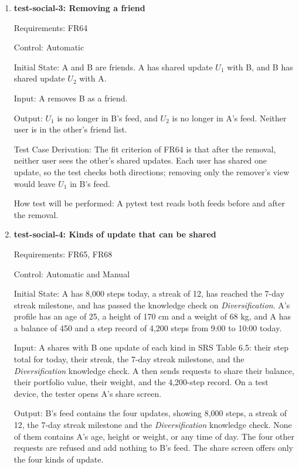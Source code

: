 \documentclass[12pt, titlepage]{article}
\begin{document}
\begin{enumerate}
How test will be performed: A pytest test sends each action as the user named
in the input and reads the friend lists, received requests and feeds after
each step.

\item{\textbf{test-social-3: Removing a friend}\\}

Requirements: FR64

Control: Automatic

Initial State: A and B are friends. A has shared update $U_1$ with B, and B
has shared update $U_2$ with A.

Input: A removes B as a friend.

Output: $U_1$ is no longer in B's feed, and $U_2$ is no longer in A's feed.
Neither user is in the other's friend list.

Test Case Derivation: The fit criterion of FR64 is that after the removal,
neither user sees the other's shared updates. Each user has shared one
update, so the test checks both directions; removing only the remover's view
would leave $U_1$ in B's feed.

How test will be performed: A pytest test reads both feeds before and after
the removal.

\item{\textbf{test-social-4: Kinds of update that can be shared}\\}

Requirements: FR65, FR68

Control: Automatic and Manual

Initial State: A has 8,000 steps today, a streak of 12, has reached the 7-day
streak milestone, and has passed the knowledge check on
\textit{Diversification}. A's profile has an age of 25, a height of 170 cm
and a weight of 68 kg, and A has a balance of 450 and a step record of 4,200
steps from 9:00 to 10:00 today.

Input: A shares with B one update of each kind in SRS Table 6.5: their step
total for today, their streak, the 7-day streak milestone, and the
\textit{Diversification} knowledge check. A then sends requests to share their
balance, their portfolio value, their weight, and the 4,200-step record. On a
test device, the tester opens A's share screen.

Output: B's feed contains the four updates, showing 8,000 steps, a streak of
12, the 7-day streak milestone and the \textit{Diversification} knowledge
check. None of them contains A's age, height or weight, or any time of day.
The four other requests are refused and add nothing to B's feed. The share
screen offers only the four kinds of update.


\end{enumerate}
\end{document}
